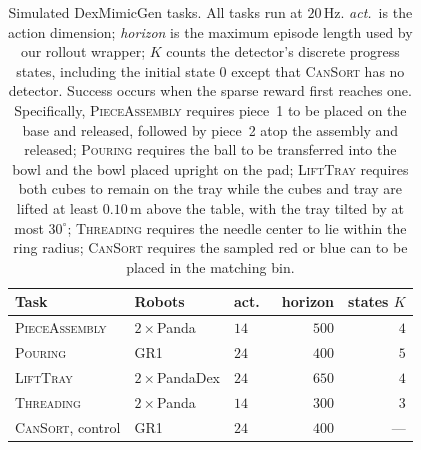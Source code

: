 \documentclass[letterpaper]{article} %
\begin{document}
\begin{table}[t]
\centering\small\setlength{\tabcolsep}{4pt}
\begin{tabular}{@{}lllrr@{}}
\toprule
Task & Robots & act.\ & horizon & states $K$ \\
\midrule
\textsc{PieceAssembly} & $2{\times}$Panda    & $14$ & $500$ & $4$ \\
\textsc{Pouring}            & GR1                 & $24$ & $400$ & $5$ \\
\textsc{LiftTray}           & $2{\times}$PandaDex  & $24$ & $650$ & $4$ \\
\textsc{Threading}          & $2{\times}$Panda    & $14$ & $300$ & $3$ \\
\textsc{CanSort}, control   & GR1                 & $24$ & $400$ & ---  \\
\bottomrule
\end{tabular}
\caption{Simulated DexMimicGen tasks. All tasks run at $20$\,Hz. \emph{act.}\ is the action
dimension; \emph{horizon} is the maximum episode length used by our rollout wrapper;
$K$ counts the detector's discrete progress states, including the initial state $0$
except that \textsc{CanSort} has no detector. Success occurs when the sparse reward first
reaches one. Specifically, \textsc{PieceAssembly} requires piece~1 to be placed on the base and
released, followed by piece~2 atop the assembly and released; \textsc{Pouring}
requires the ball to be transferred into the bowl and the bowl placed upright on the
pad; \textsc{LiftTray} requires both cubes to remain on the tray while the cubes and
tray are lifted at least $0.10$\,m above the table, with the tray tilted by at most
$30^\circ$; \textsc{Threading} requires the needle center to lie within the ring
radius; \textsc{CanSort} requires the sampled red or blue can to be placed in the
matching bin.}
\label{tab:simtasks}
\end{table}
\end{document}
